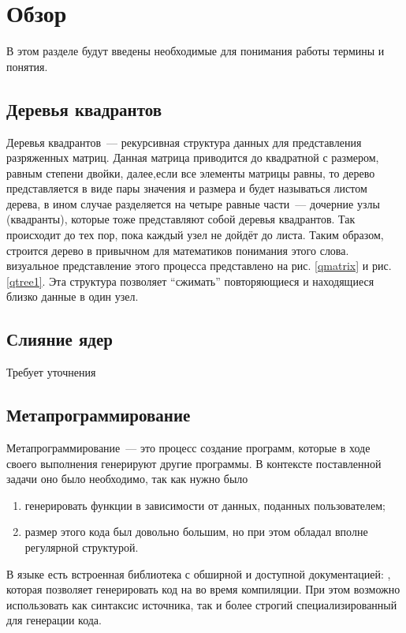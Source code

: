 
\section{Обзор}
В этом разделе будут введены необходимые для понимания работы термины и  понятия.
\subsection{Деревья квадрантов}
Деревья квадрантов~--- рекурсивная структура данных для представления разряженных матриц. Данная матрица приводится до квадратной с размером, равным степени двойки, далее,если все элементы матрицы равны, то дерево представляется в виде пары значения и размера и будет называться листом дерева, в ином случае разделяется на четыре равные части~--- дочерние узлы (квадранты), которые тоже представляют собой деревья квадрантов. Так происходит до тех пор, пока каждый узел не дойдёт до листа. Таким образом, строится дерево в привычном для математиков понимания этого слова. визуальное представление этого процесса представлено на рис. \ref{qmatrix} и рис. \ref{qtree1}. Эта структура позволяет \enquote{сжимать} повторяющиеся и находящиеся близко данные в один узел.

\subsection{Слияние ядер}
Требует уточнения
\subsection{Метапрограммирование}
Метапрограммирование~--- это процесс создание программ, которые в ходе своего выполнения генерируют другие программы. В контексте поставленной задачи оно было необходимо, так как нужно было
\begin{enumerate}[label=(\alph*)]
    \item генерировать функции в зависимости от данных, поданных пользователем;
    \item размер этого кода был довольно большим, но при этом обладал вполне регулярной структурой.
\end{enumerate}
В языке \Haskell{} есть встроенная библиотека с обширной и доступной документацией: \Th{}, которая позволяет генерировать код на \Haskell{} во время компиляции. При этом возможно использовать как синтаксис источника, так и более строгий специализированный для генерации кода.
